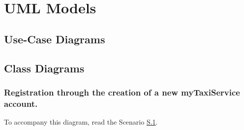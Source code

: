 \documentclass{report}
\begin{document}
	\section{UML Models}

		\subsection{Use-Case Diagrams}

		\subsection{Class Diagrams}

			\subsubsection{Registration through the creation of a new myTaxiService account.}
			To accompany this diagram, read the Scenario \hyperref[sec:NormalCustomerRegistrationScenario]{S.1}.
\end{document}

